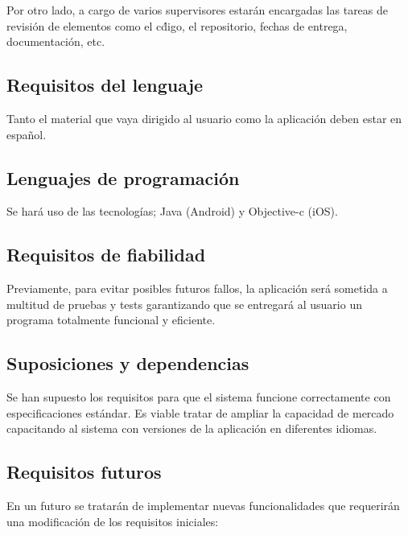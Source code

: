 Por otro lado, a cargo de varios supervisores estar\'an encargadas las tareas de revisi\'on de elementos como el c\'digo, el repositorio, fechas de entrega, documentaci\'on, etc.


\subsection{Requisitos del lenguaje}
Tanto el material que vaya dirigido al usuario como la aplicaci\'on deben estar en espa\~nol.

\subsection{Lenguajes de programaci\'on}
Se har\'a uso de las tecnolog\'ias; Java (Android) y Objective-c (iOS).    
    
\subsection{Requisitos de fiabilidad}
Previamente, para evitar posibles futuros fallos, la aplicaci\'on ser\'a sometida a multitud de pruebas y tests garantizando que se entregar\'a al usuario un programa totalmente funcional y eficiente.

\subsection{Suposiciones y dependencias}
Se han supuesto los requisitos para que el sistema funcione correctamente con especificaciones est\'andar.
Es viable tratar de ampliar la capacidad de mercado capacitando al sistema con versiones de la aplicaci\'on en diferentes idiomas.

\subsection{Requisitos futuros}
En un futuro se tratar\'an de implementar nuevas funcionalidades que requerir\'an una modificaci\'on de los requisitos iniciales: